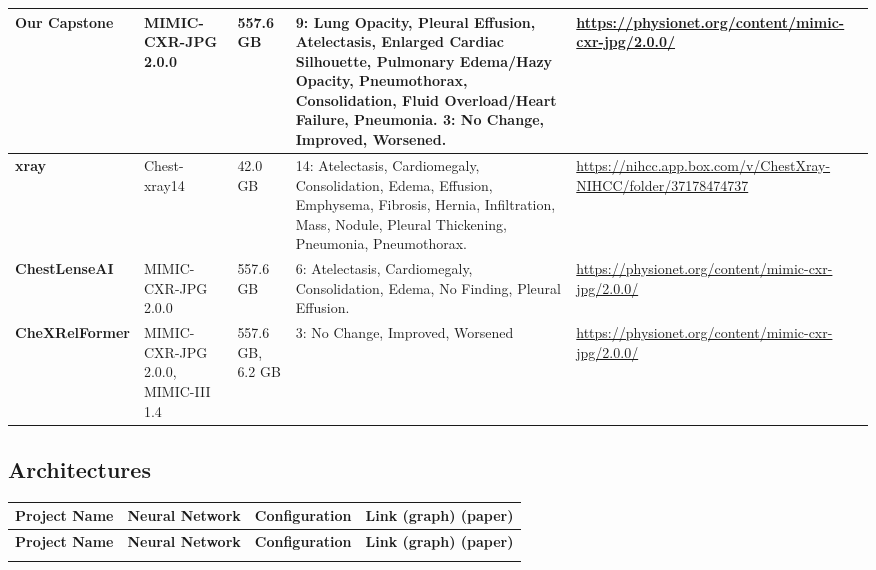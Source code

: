 \documentclass[12pt, titlepage]{article}
\begin{document}
\begin{landscape}
\begin{longtable}{|l|p{3.5cm}|p{1.8cm}|p{6cm}|p{4cm}|}
\textbf{Our Capstone}    & MIMIC-CXR-JPG 2.0.0                                                                                           & 557.6 GB                                                   & 9: Lung Opacity, Pleural Effusion, Atelectasis, Enlarged Cardiac Silhouette, Pulmonary Edema/Hazy Opacity, Pneumothorax, Consolidation, Fluid Overload/Heart Failure, Pneumonia. 3: No Change, Improved, Worsened. & \url{https://physionet.org/content/mimic-cxr-jpg/2.0.0/}        \\ \hline
\textbf{xray}           & Chest-xray14                                                                                                  & 42.0 GB                                                    & 14: Atelectasis, Cardiomegaly, Consolidation, Edema, Effusion, Emphysema, Fibrosis, Hernia, Infiltration, Mass, Nodule, Pleural Thickening, Pneumonia, Pneumothorax.                                                     & \url{https://nihcc.app.box.com/v/ChestXray-NIHCC/folder/37178474737} \\ \hline
\textbf{ChestLenseAI}   & MIMIC-CXR-JPG 2.0.0                                                                                           & 557.6 GB                                                   & 6: Atelectasis, Cardiomegaly, Consolidation, Edema, No Finding, Pleural Effusion.                                                              & \url{https://physionet.org/content/mimic-cxr-jpg/2.0.0/}        \\ \hline
\textbf{CheXRelFormer}  & MIMIC-CXR-JPG 2.0.0, MIMIC-III 1.4                                                                           & 557.6 GB, 6.2 GB                                          & 3: No Change, Improved, Worsened                                                                                                                                                                                                            & \url{https://physionet.org/content/mimic-cxr-jpg/2.0.0/}        \\
\end{longtable}

\subsection{Architectures}

\begin{longtable}{|l|l|l|p{10cm}|}
\hline
\textbf{Project Name}   & \textbf{Neural Network}  & \textbf{Configuration}  & \textbf{Link (graph) (paper)}  \\ \hline
\endfirsthead
\hline
\textbf{Project Name}   & \textbf{Neural Network}  & \textbf{Configuration}  & \textbf{Link (graph) (paper)}  \\ \hline
\endhead
\hline
\endfoot


\end{longtable}
\end{landscape}
\end{document}
